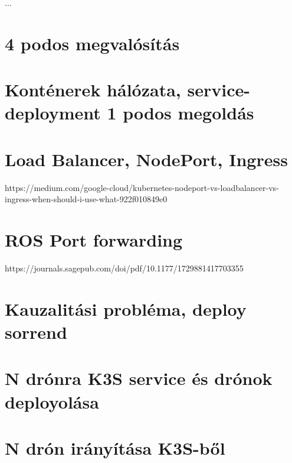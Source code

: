 ...
\section{4 podos megvalósítás}

\section{Konténerek hálózata, service-deployment 1 podos megoldás}

\section{Load Balancer, NodePort, Ingress}
https://medium.com/google-cloud/kubernetes-nodeport-vs-loadbalancer-vs-ingress-when-should-i-use-what-922f010849e0

\section{ROS Port forwarding}
https://journals.sagepub.com/doi/pdf/10.1177/1729881417703355

\section{Kauzalitási probléma, deploy sorrend}

\section{N drónra K3S service és drónok deployolása}

\section{N drón irányítása K3S-ből}
